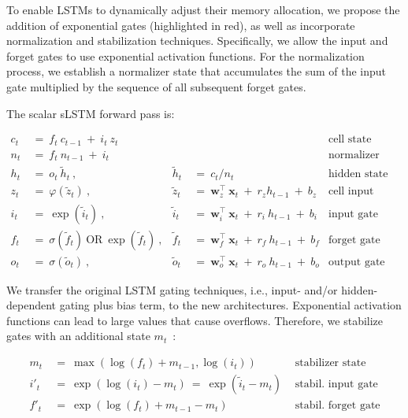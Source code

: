 To enable LSTMs to dynamically adjust their memory allocation, we propose the addition of exponential gates (highlighted in red), as well as incorporate normalization and stabilization techniques. Specifically, we allow the input and forget gates to use exponential activation functions. For the normalization process, we establish a normalizer state that accumulates the sum of the input gate multiplied by the sequence of all subsequent forget gates.

The scalar sLSTM forward pass is:

\begin{align}
\label{eq:slstmforward}
c_t \ &= \  f_t \ c_{t-1} \ + \ i_t \ z_t & & 
 &\text{cell state} \\
n_t \ &= \  f_t \ n_{t-1} \ + \ i_t  & & 
 &\text{normalizer state} \\
h_t \ &= \ o_t \ \tilde{h}_t \ ,
  &\tilde{h}_t \ &= \ c_t / n_t
&\text{hidden state} \\
z_t \ &= \ \varphi \left( \tilde{z}_t \right) \ , 
  &\tilde{z}_t \ &=  \ \mathbf{w}^\top_{z} \ \mathbf{x}_t \ + \
  r_{z}  h_{t-1} \ + \  b_{z}
  &\text{cell input} \\
i_t \ &= \ \!\exp \left( \tilde{i}_t  \right) \ , 
  &\tilde{i}_t \ &= \ \mathbf{w}^\top_{i} \ \mathbf{x}_t \ + \
  r_{i}  \ h_{t-1} \ + \  b_{i}
  &\text{input gate} \\
f_t \ &= \ \sigma \left(  \tilde{f}_t \right) \ \text{OR} \
\!\exp \left(  \tilde{f}_t \right) \ ,
  &\tilde{f}_t \ &= \ \mathbf{w}^\top_{f} \ \mathbf{x}_t  \ + \
  r_{f}  \ h_{t-1} \ + \  b_{f}
  &\text{forget gate} \\
o_t \ &= \ \sigma \left( \tilde{o}_t \right) \ , 
  &\tilde{o}_t  \ &= \ \mathbf{w}^\top_{o} \ \mathbf{x}_t \ + \
  r_{o}  \ h_{t-1} \ + \  b_{o}
  &\text{output gate} 
\end{align}

We transfer the original LSTM gating techniques, i.e., input- and/or hidden-dependent gating plus bias term, to the new architectures. Exponential activation functions can lead to large values that cause overflows. Therefore, we stabilize gates with an additional state \mbox{$m_t$~\citep{Milakov:18arxiv}}:

\begin{align}
\label{eq:slstmstabil}
m_t \ &= \ \max \left( \log ( f_t ) + m_{t-1} , \log ( i_t ) \right) &\text{stabilizer state} \\
i'_t \ &= \ \!\exp \left( \log \left ( i_t \right) - m_t \right) \ = \ \!\exp \left( \tilde{i}_t - m_t \right) \ \, 
  &\text{stabil. input gate} \\
f'_t \ &= \ \!\exp \left( \log \left( f_t \right) + m_{t-1} - m_t \right) \ \, 
  &\text{stabil. forget gate}
\end{align}

